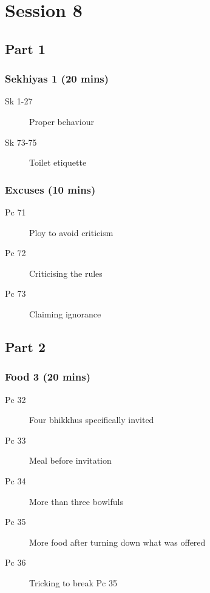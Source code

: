 \documentclass[11pt,oneside]{memoir}
\begin{document}
\chapter{Session 8}

\begin{multicols}{2}

\section{Part 1}

\subsection{Sekhiyas 1 (20 mins)}

\begin{description}
\item[Sk 1-27] Proper behaviour
\item[Sk 73-75] Toilet etiquette
\end{description}

\subsection{Excuses (10 mins)}

\begin{description}
\item[Pc 71] Ploy to avoid criticism
\item[Pc 72] Criticising the rules
\item[Pc 73] Claiming ignorance
\end{description}

\columnbreak

\section{Part 2}

\subsection{Food 3 (20 mins)}

\begin{description}
\item[Pc 32] Four bhikkhus specifically invited
\item[Pc 33] Meal before invitation
\item[Pc 34] More than three bowlfuls
\item[Pc 35] More food after turning down what was offered
\item[Pc 36] Tricking to break Pc 35
\end{description}


\end{multicols}
\end{document}
